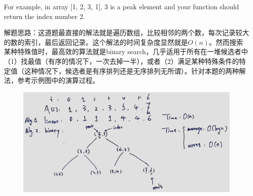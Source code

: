 \documentclass[a4paper,10pt]{article}
\begin{document}
\noindent For example, in array [1, 2, 3, 1], 3 is a peak element and your function should return the index number 2. \\

\begin{CJK*}{UTF8}{gbsn}
\noindent 解题思路：这道题最直接的解法就是遍历数组，比较相邻的两个数，每次记录较大的数的索引，最后返回记录。这个解法的时间复杂度显然就是$O(n)$。然而搜索某种特殊值时，最高效的算法就是binary search，几乎适用于所有在一堆候选者中（1）找最值（有序的情况下，一次去掉一半），或者（2）满足某种特殊条件的特定值（这种情况下，候选者是有序排列还是无序排列无所谓）。针对本题的两种解法，参考示例图中的演算过程。
\end{CJK*}

\begin{figure}[h]
    \includegraphics[width=\textwidth]{leetcode162.jpg}
    \centering \\
\end{figure}
\end{document}
